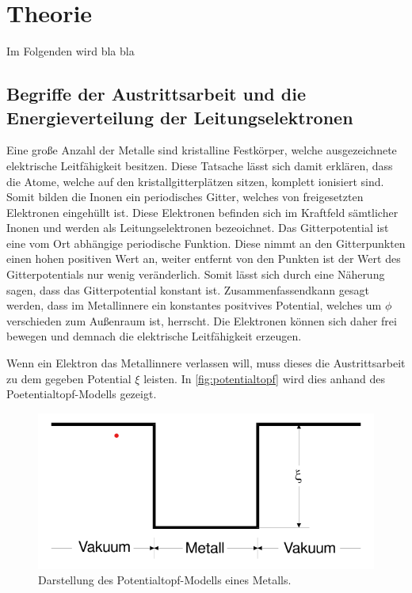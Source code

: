 \section{Theorie}
\label{sec:theorie}

Im Folgenden wird bla bla

\subsection{Begriffe der Austrittsarbeit und die Energieverteilung der Leitungselektronen}
\label{sec:Begriffe der Austrittsarbeit und die Energieverteilung der Leitungselektronen}

Eine große Anzahl der Metalle sind kristalline Festkörper, welche ausgezeichnete elektrische Leitfähigkeit besitzen.
Diese Tatsache lässt sich damit erklären, dass die Atome, welche auf den kristallgitterplätzen sitzen, komplett ionisiert sind.
Somit bilden die Inonen ein periodisches Gitter, welches von freigesetzten Elektronen eingehüllt ist.
Diese Elektronen befinden sich im Kraftfeld sämtlicher Inonen und werden als Leitungselektronen bezeoichnet.
Das Gitterpotential ist eine vom Ort abhängige periodische Funktion. Diese nimmt an den Gitterpunkten einen hohen positiven Wert an, weiter 
entfernt von den Punkten ist der Wert des Gitterpotentials nur wenig veränderlich. Somit lässt sich durch eine
Näherung sagen, dass das Gitterpotential konstant ist. Zusammenfassendkann gesagt werden, dass im Metallinnere ein konstantes 
positvives Potential, welches um $\phi$ verschieden zum Außenraum ist, herrscht. Die Elektronen können sich daher 
frei bewegen und demnach die elektrische Leitfähigkeit erzeugen.

Wenn ein Elektron das Metallinnere verlassen will, muss dieses die Austrittsarbeit zu dem gegeben Potential $\xi$ leisten.
In \autoref{fig:potentialtopf} wird dies anhand des Poetentialtopf-Modells gezeigt.
\begin{figure}[H]
    \centering
    \includegraphics[width=0.5\linewidth]{data/potential.png}
    \caption{Darstellung des Potentialtopf-Modells eines Metalls.\cite{elektron}}
    \label{fig:potentialtopf}
\end{figure}


